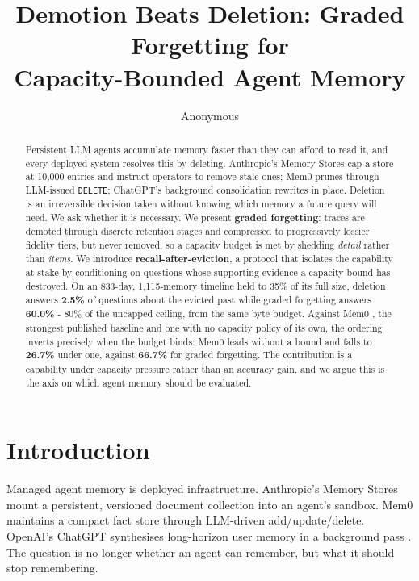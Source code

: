\documentclass{article}
\title{Demotion Beats Deletion: Graded Forgetting for\\Capacity-Bounded Agent Memory}
\author{Anonymous}
\theoremstyle{definition}\newtheorem{remark}{Remark}
\theoremstyle{plain}\newtheorem{proposition}{Proposition}
\begin{document}
\maketitle

\begin{abstract}
Persistent LLM agents accumulate memory faster than they can afford to read it,
and every deployed system resolves this by deleting. Anthropic's Memory Stores
cap a store at 10{,}000 entries and instruct operators to remove stale ones;
Mem0 prunes through LLM-issued \texttt{DELETE}; ChatGPT's background
consolidation rewrites in place. Deletion is an irreversible decision taken
without knowing which memory a future query will need. We ask whether it is
necessary. We present \textbf{graded forgetting}: traces are demoted through
discrete retention stages and compressed to progressively lossier fidelity
tiers, but never removed, so a capacity budget is met by shedding \emph{detail}
rather than \emph{items}. We introduce \textbf{recall-after-eviction}, a
protocol that isolates the capability at stake by conditioning on questions
whose supporting evidence a capacity bound has destroyed. On an 833-day,
1{,}115-memory timeline held to 35\% of its full size, deletion answers
\textbf{2.5\%} of questions about the evicted past while graded forgetting
answers \textbf{60.0\%} - 80\% of the uncapped ceiling, from the same byte
budget. Against Mem0 \citep{chhikara2025mem0}, the strongest published
baseline and one with no capacity policy of its own, the ordering inverts
precisely when the budget binds: Mem0 leads without a bound and falls to
\textbf{26.7\%} under one, against \textbf{66.7\%} for graded forgetting. The
contribution is a capability under capacity pressure rather than an accuracy
gain, and we argue this is the axis on which agent memory should be evaluated.
\end{abstract}

\section{Introduction}

Managed agent memory is deployed infrastructure. Anthropic's Memory Stores
\citep{anthropic2026memory} mount a persistent, versioned document collection
into an agent's sandbox. Mem0 \citep{chhikara2025mem0} maintains a compact fact
store through LLM-driven add/update/delete. OpenAI's ChatGPT synthesises
long-horizon user memory in a background pass \citep{openai2026dreaming}. The
question is no longer whether an agent can remember, but what it should stop
remembering.
\end{document}
